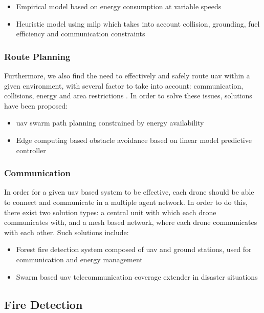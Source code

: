 \documentclass[runningheads]{llncs}
\begin{document}
\begin{itemize}
	\item Empirical model based on energy consumption at variable speeds \cite{inproceedings1}
	\item Heuristic model using \acrfull{milp} which takes into account collision, grounding, fuel efficiency and communication constraints \cite{Grotli2012} 
\end{itemize}

\subsubsection{Route Planning}

Furthermore, we also find the need to effectively and safely route \acrshort{uav} within a given environment, with several factor to take into account: communication, collisions, energy and area restrictions \cite{inproceedings}. In order to solve these issues, solutions have been proposed:

\begin{itemize}
	\item \acrshort{uav} swarm path planning constrained by energy availability \cite{inproceedings}
	\item Edge computing based obstacle avoidance based on linear model predictive controller \cite{inproceedings2}
\end{itemize}

\subsubsection{Communication}

In order for a given \acrshort{uav} based system to be effective, each drone should be able to connect and communicate in a multiple agent network. In order to do this, there exist two solution types: a central unit with which each drone communicates with, and a mesh based network, where each drone communicates with each other. Such solutions include:

\begin{itemize}
	\item Forest fire detection system composed of \acrshort{uav} and ground stations, used for communication and energy management \cite{inproceedings3}
	\item Swarm based \acrshort{uav} telecommunication coverage extender in disaster situations \cite{6318390}
\end{itemize}
\subsection{Fire Detection}
\end{document}
